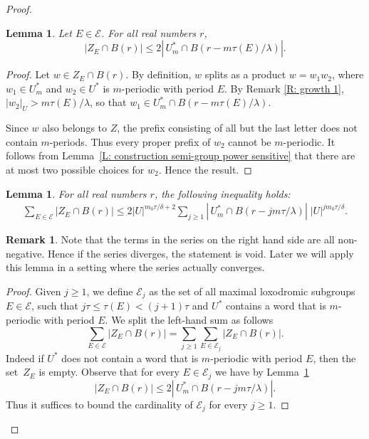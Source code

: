\documentclass[11pt]{article}
\let\mathcal\mathscr
\theoremstyle{plain}
\newtheorem{lem}[thm]{Lemma}
\theoremstyle{definition}
\newtheorem{rem}[thm]{Remark}
\begin{document}
\begin{proof}
\begin{lem}\label{L: growth 3} Let $E\in \mathcal{E}$.
For all real numbers $r$,
\begin{equation*}
|Z_E\cap B(r)| \leqslant 2 |\, U^*_m \cap B\left(r-m \tau(E)/\lambda\right)|.
\end{equation*}
\end{lem}
\begin{proof}
Let $w\in Z_E\cap B(r)$. By definition, $w$ splits as a product $w=w_1w_2$, where $w_1 \in U^*_m$ and $w_2\in U^*$ is $m$-periodic with period $E$.
By Remark \ref{R: growth 1}, $|w_2|_U> m \tau(E)/\lambda$, so that $w_1 \in U^*_m \cap B(r-m \tau(E)/\lambda)$.

Since $w$ also belongs to $Z$, the prefix consisting of all but the last letter does not contain $m$-periods.
Thus every proper prefix of $w_2$ cannot be $m$-periodic.
It follows from Lemma~\ref{L: construction semi-group power sensitive} that there are at most two possible choices for $w_2$.
Hence the result.
\end{proof}

\begin{lem}\label{I: growth 3} For all real numbers $r$, the following inequality holds:
\begin{align*}
\sum_{E\in \mathcal{E}} |Z_E\cap B(r)| \leqslant
2|U|^{m_0\tau/\delta +2}
\sum_{j\geqslant 1} |\, U^*_m \cap B\left(r -jm\tau/\lambda\right)|\; |U|^{ jm_0\tau/\delta}.
\end{align*}
\end{lem}

\begin{rem}
Note that the terms in the series on the right hand side are all non-negative.
Hence if the series diverges, the statement is void.
Later we will apply this lemma in a setting where the series actually converges.
\end{rem}

\begin{proof}
Given $j \geq 1$, we define $\mathcal E_j$ as the set of all maximal loxodromic subgroups $E \in \mathcal E$, such that $j\tau \leq \tau(E) < (j+1)\tau$ and $U^*$ contains a word that is $m$-periodic with period $E$.
We split the left-hand sum as follows
\begin{equation*}
\sum_{E\in \mathcal{E}} |Z_E\cap B(r)|
= \sum_{j \geq 1} \sum_{E\in \mathcal{E}_j} |Z_E\cap B(r)|.
\end{equation*}
Indeed if $U^*$ does not contain a word that is $m$-periodic with period $E$, then the set~$Z_E$ is empty.
Observe that for every $E \in \mathcal E_j$ we have by Lemma~\ref{L: growth 3}
\begin{equation*}
|Z_E\cap B(r)| \leqslant 2 |\, U^*_m \cap B\left(r -jm\tau/\lambda\right)|.
\end{equation*}
Thus it suffices to bound the cardinality of $\mathcal E_j$ for every $j \geq 1$.


\end{proof}
\end{proof}
\end{document}
